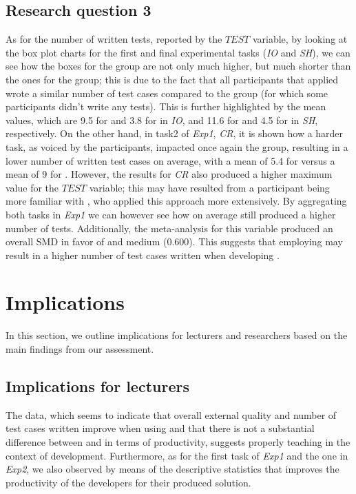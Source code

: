 \subsection{Research question 3}
As for the number of written tests, reported by the $TEST$ variable, by looking at the box plot charts for the first and final experimental tasks (\ie \textit{IO} and \textit{SH}), we can see how the boxes for the \tdd group are not only much higher, but much shorter than the ones for the \notdd group; this is due to the fact that all participants that applied \tdd wrote a similar number of test cases compared to the \notdd group (for which some participants didn't write any tests).
This is further highlighted by the mean values, which are 9.5 for \tdd and 3.8 for \notdd in \textit{IO}, and 11.6 for \tdd and 4.5 for \notdd in \textit{SH}, respectively.
On the other hand, in task2 of \textit{Exp1}, \textit{CR}, it is shown how a harder task, as voiced by the participants, impacted once again the \tdd group, resulting in a lower number of written test cases on average, with a mean of 5.4 for \tdd versus a mean of 9 for \notdd. However, the results for \textit{CR} also produced a higher maximum value for the $TEST$ variable; this may have resulted from a participant being more familiar with \tdd, who applied this approach more extensively.
By aggregating both tasks in \textit{Exp1} we can however see how on average \tdd still produced a higher number of tests.
Additionally, the meta-analysis for this variable produced an overall SMD in favor of \tdd and medium (0.600).
This suggests that employing \tdd may result in a higher number of test cases written when developing \ess.





\section{Implications}
In this section, we outline implications for lecturers and researchers based on the main findings from our assessment. 

\subsection{Implications for lecturers}
The data, which seems to indicate that overall external quality and number of test cases written improve when using \tdd and that there is not a substantial difference between \tdd and \notdd in terms of productivity, suggests properly teaching \tdd in the context of \es development. Furthermore, as for the first task of \textit{Exp1} and the one in \textit{Exp2}, we also observed by means of the descriptive statistics that \tdd improves the productivity of the developers for their produced solution.

